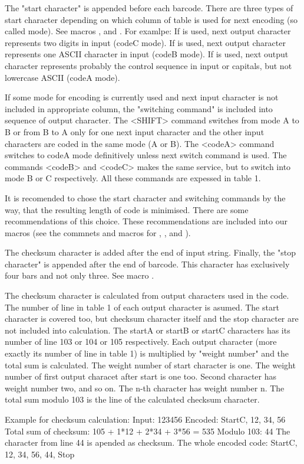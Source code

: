 The "start character" is appended before each barcode. There are three
types of start character depending on which column of table is used for
next encoding (so called mode). See macros \startA, \startB and \startC.
For examlpe: If \startC is used, next output character represents two
digits in input (codeC mode). If \startB is used, next output character
represents one ASCII character in input (codeB mode). If \startA is used,
next output character represents probably the control sequence in input or
capitals, but not lowercase ASCII (codeA mode).

If some mode for encoding is currently used and next input character is not
included in appropriate column, the "switching command" is included into
sequence of output character. The <SHIFT> command switches from mode A to
B or from B to A only for one next input character and the other input
characters are coded in the same mode (A or B). The <codeA> command
switches to codeA mode definitively unless next switch command is used.
The commands <codeB> and <codeC> makes the same service, but to switch into
mode B or C respectively. All these commands are expessed in table 1.

It is recomended to chose the start character and switching commands by the
way, that the resulting length of code is minimised. There are some
recommendations of this choice. These recommendations are included into our
macros (see the commnets and macros for \code, \codeA, \codeB and \codeC).

The checksum character is added after the end of input string. Finally,
the "stop character" is appended after the end of barcode. This character
has exclusively four bars and not only three. See macro \stop.

The checksum character is calculated from output characters used in the
code. The number of line in table 1 of each output character is asumed. The
start character is covered too, but checksum character itself and the
stop character are not included into calculation. The startA or startB or
startC characters has its number of line 103 or 104 or 105 respectively. Each
output character (more exactly its number of line in table 1) is multiplied
by "weight number" and the total sum is calculated. The weight number of
start character is one. The weight number of first output characet after
start is one too. Second character has weight number two, and so on. The
n-th character has weight number n. The total sum modulo 103 is the line of
the calculated checksum character.

Example for checksum calculation:
Input:    123456
Encoded:  StartC, 12, 34, 56
Total sum of checksum: 105 + 1*12 + 2*34 + 3*56 = 535
Modulo 103: 44
The character from line 44 is apended as checksum.
The whole encoded code: StartC, 12, 34, 56, 44, Stop

